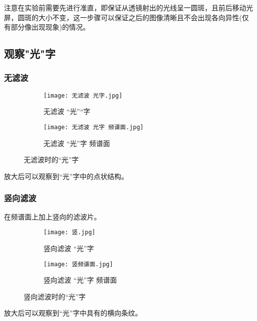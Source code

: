 \documentclass[11pt]{article}
\begin{document}
	注意在实验前需要先进行准直，即保证从透镜射出的光线呈一圆斑，且前后移动光屏，圆斑的大小不变，这一步骤可以保证之后的图像清晰且不会出现各向异性(仅有部分像出现现象)的情况。
	
	
	
	\subsection{观察"光"字}
	
	\subsubsection{无滤波}

	\begin{figure}[H]
		\centering
		\begin{subfigure}[t]{0.45\textwidth}  %
			\centering
			\texttt{[image: 无滤波 光字.jpg]}  %
			\caption{无滤波 “光”“字}
		\end{subfigure}
		\begin{subfigure}[t]{0.45\textwidth}  %
			\centering
			\texttt{[image: 无滤波 光字 频谱面.jpg]}  %
			\caption{无滤波 “光”字 频谱面}
		\end{subfigure}
		\caption{无滤波时的“光”字}
		\label{fig:无滤波_光字}
	\end{figure}
	
	放大后可以观察到“光”字中的点状结构。
	
	\subsubsection{竖向滤波}
	
	在频谱面上加上竖向的滤波片。
	
	\begin{figure}[H]
		\centering
		\begin{subfigure}[t]{0.45\textwidth}  %
			\centering
			\texttt{[image: 竖.jpg]}  %
			\caption{竖向滤波 “光”字}
		\end{subfigure}
		\begin{subfigure}[t]{0.45\textwidth}  %
			\centering
			\texttt{[image: 竖频谱面.jpg]}  %
			\caption{竖向滤波 “光”字 频谱面}
		\end{subfigure}
		\caption{竖向滤波时的“光”字}
		\label{fig:竖向滤波_光字}
	\end{figure}
	放大后可以观察到“光”字中具有的横向条纹。
	
\end{document}
